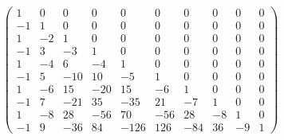 \begin{displaymath} \left(\begin{array}{rrrrrrrrrr}
1 & 0 & 0 & 0 & 0 & 0 & 0 & 0 & 0 & 0 \\
-1 & 1 & 0 & 0 & 0 & 0 & 0 & 0 & 0 & 0 \\
1 & -2 & 1 & 0 & 0 & 0 & 0 & 0 & 0 & 0 \\
-1 & 3 & -3 & 1 & 0 & 0 & 0 & 0 & 0 & 0 \\
1 & -4 & 6 & -4 & 1 & 0 & 0 & 0 & 0 & 0 \\
-1 & 5 & -10 & 10 & -5 & 1 & 0 & 0 & 0 & 0 \\
1 & -6 & 15 & -20 & 15 & -6 & 1 & 0 & 0 & 0 \\
-1 & 7 & -21 & 35 & -35 & 21 & -7 & 1 & 0 & 0 \\
1 & -8 & 28 & -56 & 70 & -56 & 28 & -8 & 1 & 0 \\
-1 & 9 & -36 & 84 & -126 & 126 & -84 & 36 & -9 & 1
\end{array}\right) \end{displaymath}